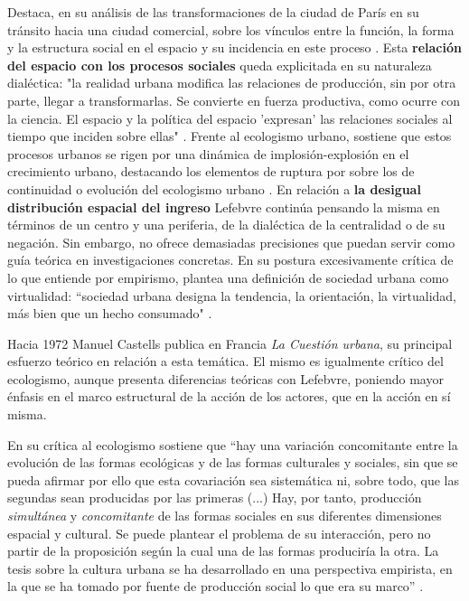 Destaca, en su análisis de las transformaciones de la ciudad de París en su tránsito hacia una ciudad comercial, sobre los vínculos entre la función, la forma y la estructura social en el espacio y su incidencia en este proceso \cite[~17]{lefebvre}. Esta \textbf{relación del espacio con los procesos sociales} queda explicitada en su naturaleza dialéctica: "la realidad urbana modifica las relaciones de producción, sin por otra parte, llegar a transformarlas. Se convierte en fuerza productiva, como ocurre con la ciencia. El espacio y la política del espacio 'expresan' las relaciones sociales al tiempo que inciden sobre ellas" \cite[~21]{lefebvre}. Frente al ecologismo urbano, sostiene que estos procesos urbanos se rigen por una dinámica de implosión-explosión en el crecimiento urbano, destacando los elementos de ruptura por sobre los de continuidad o evolución del ecologismo urbano \cite[~20]{lefebvre}. En relación a \textbf{la desigual distribución espacial del ingreso} Lefebvre continúa pensando la misma en términos de un centro y una periferia, de la dialéctica de la centralidad o de su negación. Sin embargo, no ofrece demasiadas precisiones que puedan servir como guía teórica en investigaciones concretas. En su postura excesivamente crítica de lo que entiende por empirismo, plantea una definición de sociedad urbana como virtualidad: “sociedad urbana designa la tendencia, la orientación, la virtualidad, más bien que un hecho consumado" \cite[~8]{lefebvre}. 

Hacia 1972 Manuel Castells publica en Francia \textit{La Cuestión urbana}, su principal esfuerzo teórico en relación a esta temática. El mismo es igualmente crítico del ecologismo, aunque presenta diferencias teóricas con Lefebvre, poniendo mayor énfasis en el marco estructural de la acción de los actores, que en la acción en sí misma. 

En su crítica al ecologismo  sostiene que “hay una variación concomitante entre la evolución de las formas ecológicas y de las formas culturales y sociales, sin que se pueda afirmar por ello que esta covariación sea sistemática ni, sobre todo, que las segundas sean producidas por las primeras (...) Hay, por tanto, producción \textit{simultánea} y \textit{concomitante} de las formas sociales en sus diferentes dimensiones espacial y cultural. Se puede plantear el problema de su interacción, pero no partir de la proposición según la cual una de las formas produciría la otra. La tesis sobre la cultura urbana se ha desarrollado en una perspectiva empirista, en la que se ha tomado por fuente de producción social lo que era su marco” \cite[~104]{castells} .

